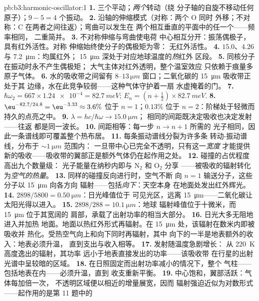 \begin{solution}{pb:b3:harmonic-oscillator:1}
\textbf{1.} 三个平动；\emph{两个}转动（绕
分子轴的自旋不移动任何原子）；$9 - 5 = 4$ 个振动。
\textbf{2.} 沿轴的伸缩模式（对称：两个 O 同时
外移；不对称：C 在两者之间往返）；弯曲可以发生在
两个相互垂直的平面中的任一个——频率相同，
二重简并。
\textbf{3.} 不对称伸缩与弯曲使电荷
中心相互分开：振荡偶极子，具有红外活性。对称
伸缩始终使分子的偶极矩为零：
无红外活性。
\textbf{4.} $15.0$、$4.26$ 与 \qty{7.2}{\micro m}：均属红外；
\qty{15}{\micro m} 深处于对应地球温度的\emph{热}红外
区段。
\textbf{5.} 同核分子在振动时永不产生偶极矩；
大气主体对红外透明，整个温室效应
只依赖于痕量多原子气体。
\textbf{6.} 水的吸收带之间留有 $8$--$13\,\unit{\micro m}$
窗口；二氧化碳的 \qty{15}{\micro m} 吸收带正处于其
边缘，水在此竞争较弱——这种气体守护着一扇
水虚掩着的门。
\textbf{7.} $\hbar\omega_2 = 667 \times \num{1.24e-4} =
\qty{82.7}{meV}$; $E_n = (n + \tfrac12) \times \qty{82.7}{meV}$.
\textbf{8.} $\eu^{-82.7/24.8} = \eu^{-3.33} \approx 3.6\%$ 位于 $n =
1$；$0.13\%$ 位于 $n = 2$：阶梯处于轻微而持久的点亮之中。
\textbf{9.} $\lambda = hc/\hbar\omega \to \qty{15.0}{\micro m}$；
相同的间距既决定吸收也决定发射——往返
都是同一波长。
\textbf{10.} 间距相等：每一步 $n \to n + 1$ 所需的
光子相同，因此一条谱线即可覆盖整个热布居。
\textbf{11.} 每条振动谱线分裂为许多条
转动-振动谱线，分布于 $\sim\qty{1}{\micro m}$ 范围内：
一旦带中心已完全不透明，只有这一\emph{宽度}
才能提供新的吸收——吸收带的翼部正是额外气体仍在起作用之处。
\textbf{12.} 碰撞的占优程度高出九个数量级：
光子能量在纳秒内即与 N$_2$ 和 O$_2$ 分享
——被吸收的辐射转化为\emph{空气的热量}。
\textbf{13.} 同样的碰撞反向进行时，空气不断
向 $n = 1$ 输送分子，这些分子以 \qty{15}{\micro m} 向各方向
辐射——包括\emph{向下}：天空本身
在地面处发出红外辉光。
\textbf{14.} $2898/5800 = \qty{0.50}{\micro m}$：日光峰值位于
可见光区，远离 \qty{15}{\micro m}——二氧化碳让
太阳光得以进入。
\textbf{15.} $2898/288 = \qty{10.1}{\micro m}$：地球
辐射峰值位于十微米，而 \qty{15}{\micro m} 位于其宽阔的
肩部，承载了出射功率的相当大部分。
\textbf{16.} 日光大多无阻地进入并加热
地面。地面以热红外形式再辐射。在
\qty{15}{\micro m} 处，该辐射在数米内即被吸收并
热化。受热空气向上和向下同时再辐射，其中
向下的一半是地表额外的收入：地表必须升温，
直到支出与收入相等。
\textbf{17.} 发射随温度急剧增长：
从 \qty{220}{K} 高度逸出的辐射，其功率
远小于地表直接发出的功率——该吸收带
在行星的出射光谱中呈较暗的区域。
\textbf{18.} 在日照固定而出射功率减小的情况下，整个
气柱——包括地表在内——必须升温，直到
收支重新平衡。
\textbf{19.} 中心饱和，翼部活跃：气体每加倍一次，
不透明区域便以相近的增量展宽，因而
辐射强迫近似为对数形式——起作用的是第 11 题中的

\end{solution}

